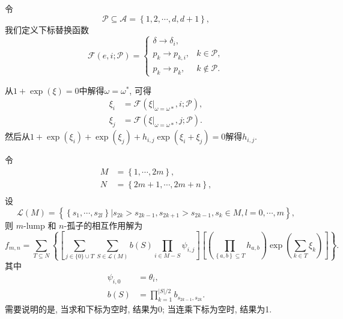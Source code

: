 \documentclass{article}
\newcommand{\sbrace}[1]{\left(#1\right)}
\newcommand{\mbrace}[1]{\left[#1\right]}
\newcommand{\bbrace}[1]{\left\{#1\right\}}
\newcommand{\eval}[2]{\left.{#1}\right|_{#2}}
\newcommand{\ALLP}{\mathcal{A}}
\newcommand{\PS}{\mathcal{P}}
\begin{document}
令
\begin{equation}
\PS\subseteq \ALLP=\bbrace{1,2,\cdots,d,d+1} ,
\end{equation}
我们定义下标替换函数
\begin{equation}
\mathcal F\sbrace{e,i;\PS}=\left\{\begin{array}{ll}
  \delta \to \delta_i, &  \\ 
  p_k \to p_{k,i}, & k \in \PS ,\\ 
  p_k \to p_k , & k \not\in\PS .
\end{array}\right.
\end{equation}

从$1+\exp(\xi)=0$中解得$\omega=\omega^*$, 可得 
\begin{equation}
\begin{aligned}
  \xi_i&=\mathcal{F}\sbrace{\eval{\xi}{\omega=\omega*},i;\PS} ,\\
  \xi_j&=\mathcal{F}\sbrace{\eval{\xi}{\omega=\omega*},j;\PS} .
\end{aligned}
\end{equation}
然后从$1+\exp(\xi_i)+\exp(\xi_j)+h_{i,j}\exp(\xi_i+\xi_j)=0$解得$h_{i,j}$. 

令
\begin{equation}
\begin{aligned}
M&=\bbrace{1,\cdots,2m}, \\ 
N&=\bbrace{2m+1,\cdots,2m+n}, \\ 
\end{aligned}
\end{equation}
设
\begin{equation}
\mathcal{L}(M)=\bbrace{\bbrace{s_1,\cdots,s_{2l}}|s_{2k}>s_{2k-1},s_{2k+1}>s_{2k-1},s_k\in M,l=0,\cdots,m} , 
\end{equation}
则 $m$-lump 和 $n$-孤子的相互作用解为
\begin{equation}
f_{m,n}=\sum_{T\subseteq N}\bbrace{
  \mbrace{\sum_{j\in \{0\}\cup T}{
    \sum_{S\in \mathcal{L}(M)}{
      b(S)
      \prod_{i\in M-S}{\psi_{i,j}}
    }
  }}
  \mbrace{
    \sbrace{\prod_{\bbrace{a,b}\subseteq T}{h_{a,b}}}
    \exp\sbrace{\sum_{k\in T}{\xi_k}}
  }
}. 
\end{equation}
其中 
\begin{equation}
\begin{aligned}
\psi_{i,0}&=\theta_i, \\ 
b(S)&=\prod_{k=1}^{|S|/2}{b_{s_{2k-1},s_{2k}}} .
\end{aligned}
\end{equation}
需要说明的是, 当求和下标为空时, 结果为0; 当连乘下标为空时, 结果为1. 
\end{document}
